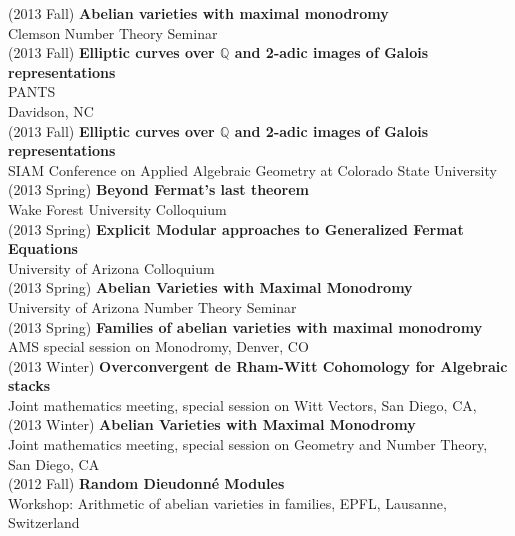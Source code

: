 \documentclass[margin,line]{res}
\begin{document}
\begin{resume}
(2013 Fall) \textbf{Abelian varieties with maximal monodromy}\\  
Clemson Number Theory Seminar 
\vspace{.05cm}\\
(2013 Fall) \textbf{Elliptic curves over $\mathbb{Q}$ and 2-adic images of Galois representations}\\  
PANTS\\ Davidson, NC
\vspace{.05cm}\\
(2013 Fall) \textbf{Elliptic curves over $\mathbb{Q}$ and 2-adic images of Galois representations}\\  
SIAM Conference on Applied Algebraic Geometry at Colorado State University 
\vspace{.05cm}\\
(2013 Spring) \textbf{Beyond Fermat's last theorem}\\
Wake Forest University Colloquium
\vspace{.05cm}\\
(2013 Spring) \textbf{Explicit Modular approaches to Generalized Fermat Equations}\\
University of Arizona Colloquium
\vspace{.05cm}\\
(2013 Spring) \textbf{Abelian Varieties with Maximal Monodromy}\\
University of Arizona Number Theory Seminar 
\vspace{.05cm}\\
(2013 Spring) \textbf{Families of abelian varieties with maximal monodromy}\\
AMS special session on Monodromy, 
Denver, CO
\vspace{.05cm}\\
(2013 Winter) \textbf{Overconvergent de Rham-Witt Cohomology for Algebraic stacks}\\
Joint mathematics meeting, special session on Witt Vectors, San Diego, CA, 
\vspace{.05cm}\\
(2013 Winter) \textbf{Abelian Varieties with Maximal Monodromy}\\
Joint mathematics meeting, special session on Geometry and Number Theory, San Diego, CA
\vspace{.05cm}\\
(2012 Fall) \textbf{Random Dieudonn\'e Modules}\\
Workshop: Arithmetic of abelian varieties in families, EPFL, Lausanne, Switzerland 

\end{resume}
\end{document}
